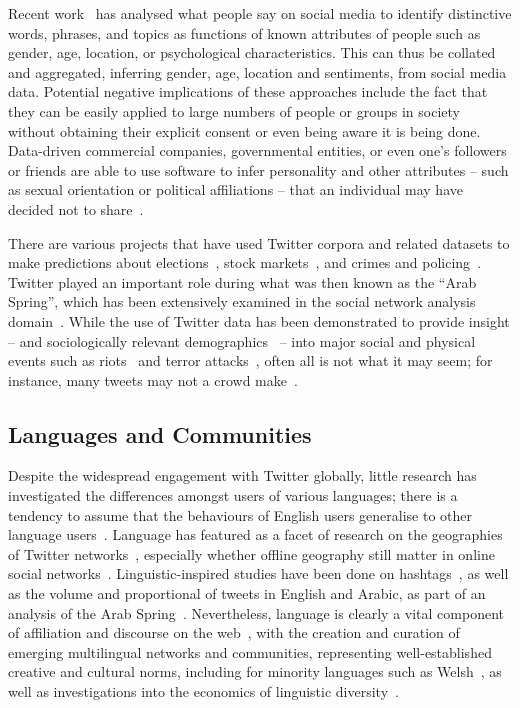 Recent
work~\cite{blamey-et-al-2012,schwartz-et-al:2013,blamey-et-al-2013,oatley+crick:2014,mostafa-et-al-ai2016}
has analysed what people say on social media to identify distinctive
words, phrases, and topics as functions of known attributes of people
such as gender, age, location, or psychological characteristics. This
can thus be collated and aggregated, inferring gender, age, location
and sentiments, from social media data. Potential negative
implications of these approaches include the fact that they can be
easily applied to large numbers of people or groups in society without
obtaining their explicit consent or even being aware it is being
done. Data-driven commercial companies, governmental entities, or
even one's followers or friends are able to use software to infer
personality and other attributes -- such as sexual orientation or
political affiliations -- that an individual may have decided not to
share~\cite{lambiotte+kosinski:2014,postsm:2014}.

There are various projects that have used Twitter corpora and related
datasets to make predictions about
elections~\cite{tumasjan-et-al:2010}, stock
markets~\cite{zhang-et-al:2011}, and crimes and
policing~\cite{gerber:2014,oatley+crick:2015}. Twitter played an
important role during what was then known as the ``Arab Spring'',
which has been extensively examined in the social network analysis
domain~\cite{lotan-et-al:2011,howard-et-al:2011,comunello+anzera:2012,wolfsfeld-et-al:2013,bruns-et-al:2013}.
While the use of Twitter data has been demonstrated to provide insight
-- and sociologically relevant demographics~\cite{sloan-et-al:2013} --
into major social and physical events such as
riots~\cite{procter-et-al:2013} and terror
attacks~\cite{burnap-et-al:2014}, often all is not what it may seem;
for instance, many tweets may not a crowd
make~\cite{liang-et-al:2013}.

\subsection{Languages and Communities}

Despite the widespread engagement with Twitter globally, little
research has investigated the differences amongst users of various
languages; there is a tendency to assume that the behaviours of
English users generalise to other language
users~\cite{hong-et-al:2011}. Language has featured as a facet of
research on the geographies of Twitter
networks~\cite{takhteyev-et-al:2012}, especially whether offline
geography still matter in online social
networks~\cite{kulshrestha-et-al:2012}. Linguistic-inspired studies
have been done on hashtags~\cite{cunha-et-al:2011}, as well as the
volume and proportional of tweets in English and Arabic, as part of an
analysis of the Arab Spring~\cite{bruns-et-al:2013}. Nevertheless,
language is clearly a vital component of affiliation and discourse on
the web~\cite{zappavigna+martin:2012}, with the creation and curation
of emerging multilingual networks and communities, representing
well-established creative and cultural norms, including for minority
languages such as Welsh~\cite{gj+uj:2013}, as well as investigations
into the economics of linguistic
diversity~\cite{ginsburgh+weber:2011}.

